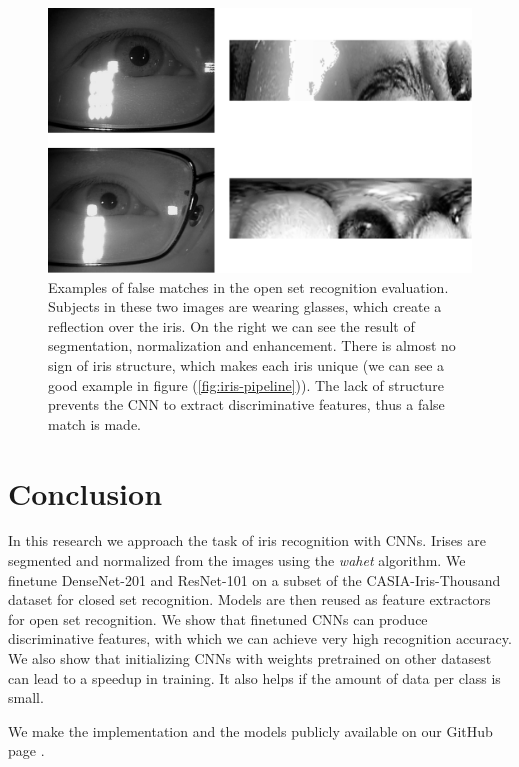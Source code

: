 \documentclass[9pt]{IEEEtran}
\begin{document}
\begin{figure}[h]
    \centering
    \includegraphics[width=1\columnwidth]{figures/iris-cnn-bad-segmentation.png}
    \caption{Examples of false matches in the open set recognition evaluation. Subjects in these two images are wearing glasses, which create a reflection over the iris. On the right we can see the result of segmentation, normalization and enhancement. There is almost no sign of iris structure, which makes each iris unique (we can see a good example in figure (\ref{fig:iris-pipeline})). The lack of structure prevents the CNN to extract discriminative features, thus a false match is made.}
    \label{fig:iris-poor-images-example}
\end{figure}
 

\section{Conclusion}
In this research we approach the task of iris recognition with CNNs. Irises are segmented and normalized from the images using the \textit{wahet} algorithm. We finetune DenseNet-201 and ResNet-101 on a subset of the CASIA-Iris-Thousand dataset for closed set recognition. Models are then reused as feature extractors for open set recognition. We show that finetuned CNNs can produce discriminative features, with which we can achieve very high recognition accuracy. We also show that initializing CNNs with weights pretrained on other datasest can lead to a speedup in training. It also helps if the amount of data per class is small.

We make the implementation and the models publicly available on our GitHub page \cite{andrej-github}.



\end{document}
